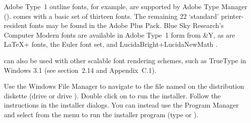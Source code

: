 \endbullets

Adobe Type~1 outline fonts, for example, are supported by Adobe Type
Manager ({\ATM}).  {\ATM} comes with a basic set of thirteen fonts.
The remaining 22 `standard' printer-resident fonts may be found in the
Adobe Plus Pack. 
Blue Sky Research's Computer Modern fonts are available in 
Adobe Type~1 form %
from {\Y&Y}, as are {\LaTeX}+{\SliTeX} fonts, the Euler font set,
and Lucida{\registered}Bright+LucidaNewMath%
. 

{\DVIWindo} can also be used with other scalable font rendering schemes,
such as True\-Type in Windows 3.1 (see section~2.14 and Appendix~C.1).


	
%

Use the Windows File Manager to navigate to the file named
 on the distribution diskette (drive 
or drive ).  Double click on  to run the
installer. Follow the instructions in the installer dialogs. 
You can instead use the Program Manager and select  from
the  menu to run the installer program 
(type  or ).

%
%
% 
%

